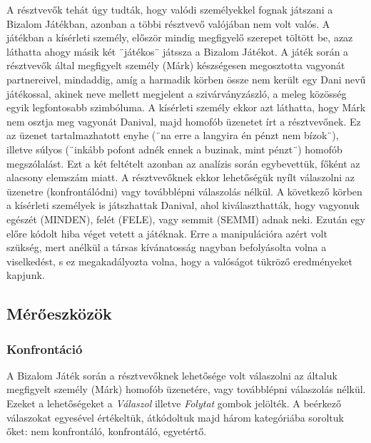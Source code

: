 A résztvevők tehát úgy tudták, hogy valódi személyekkel fognak játszani a Bizalom Játékban, azonban a többi résztvevő valójában nem volt valós. A játékban a kísérleti személy, először mindig megfigyelő szerepet töltött be, azaz láthatta ahogy másik két ¨játékos¨ játssza a Bizalom Játékot. A játék során a résztvevők által megfigyelt személy (Márk) készségesen megosztotta vagyonát partnereivel, mindaddig, amíg a harmadik kör\-ben össze nem került egy Dani nevű játékossal, akinek neve mellett megjelent a szivárvány\-zászló, a meleg közösség egyik legfontosabb szimbóluma. A kísérleti személy ekkor azt láthatta, hogy Márk nem osztja meg vagyonát Danival, majd homofób üzenetet írt a résztvevőnek. Ez az üzenet tartalmazhatott enyhe (¨na erre a langyira én pénzt nem bízok¨), illetve súlyos (¨inkább pofont adnék ennek a buzinak, mint pénzt¨) homofób megszólalást. Ezt a két feltételt azonban az analízis során egybevettük, főként az alacsony elemszám miatt. A résztvevőknek ekkor lehetőségük nyílt válaszolni az üzenetre (konfrontálódni) vagy továbblépni válaszolás nélkül. A következő körben a kísérleti személyek is játszhattak Danival, ahol kiválaszthatták, hogy vagyonuk egészét (MINDEN), felét (FELE), vagy semmit (SEMMI) adnak neki. Ezután egy előre kódolt hiba véget vetett a játéknak. Erre a manipulációra azért volt szükség, mert anélkül a társas kívánatosság nagyban befolyásolta volna a viselkedést, s  ez megakadályozta volna, hogy a valóságot tükröző eredményeket kapjunk.
\pagebreak

\subsection{Mérőeszközök}

\subsubsection{Konfrontáció}
A Bizalom Játék során a résztvevőknek lehetősége volt válaszolni az általuk megfigyelt személy (Márk) homofób üzenetére, vagy továbblépni válaszolás nélkül. Ezeket a lehetőségeket a \textit{Válaszol} illetve \textit{Folytat}  gombok jelölték. A beérkező válaszokat egyesével értékeltük, átkódoltuk majd három kategóriába soroltuk őket: nem konfrontáló, konfrontáló, egyetértő.
